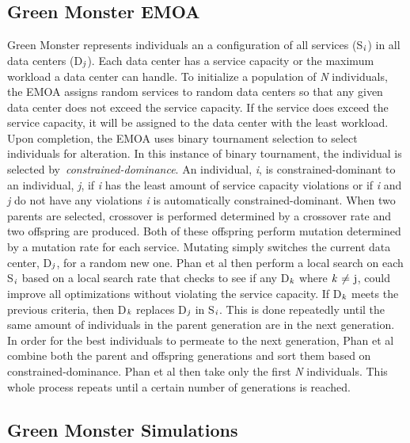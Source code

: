 \documentclass{sig-alternate}
\begin{document}
\subsection{Green Monster EMOA}
\label{sec:GMEMOA}

Green Monster represents individuals an a configuration of all services (S$_{\text{\emph{i}}}$) in all data centers (D$_{\text{\emph{j}}}$). Each data center has a service capacity
or the maximum workload a data center can handle. To initialize a population of \emph{N} individuals, the EMOA assigns random services to random data centers so that any given data center does not exceed the service capacity. If the service does exceed the service capacity, it will be assigned to the data center with the least workload. Upon completion, the EMOA uses binary tournament selection to select individuals for alteration. In this instance of binary tournament, the individual is selected by~\emph{constrained-dominance}. An individual, \emph{i},  is constrained-dominant to an individual, \emph{j}, if \emph{i} has the least amount of service capacity violations or if \emph{i} and \emph{j} do not have any violations \emph{i} is automatically constrained-dominant. When two parents are selected, crossover is performed determined by a crossover rate and two offspring are produced. Both of these offspring perform mutation determined by a mutation rate for each service. Mutating simply switches the current data center, D$_{\text{\emph{j}}}$, for a random new one. Phan et al then perform a local search on each S$_{\text{\emph{i}}}$  based on a local search rate that checks to see if any D$_{\text{\emph{k}}}$ where ${\text{\emph{k} ${\neq}$ j}}$, could improve all optimizations without violating the service capacity. If D$_{\text{\emph{k}}}$ meets the previous criteria, then D$_{\text{\emph{k}}}$ replaces D$_{\text{\emph{j}}}$ in S$_{\text{\emph{i}}}$. This is done repeatedly until the same amount of individuals in the parent generation are in the next generation. In order for the best individuals to permeate to the next generation, Phan et al combine both the parent and offspring generations and sort them based on constrained-dominance. Phan et al then take only the first \emph{N} individuals. This whole process repeats until a certain number of generations is reached. 

\subsection{Green Monster Simulations}
\label{sec:GMSims}
 
\end{document}
